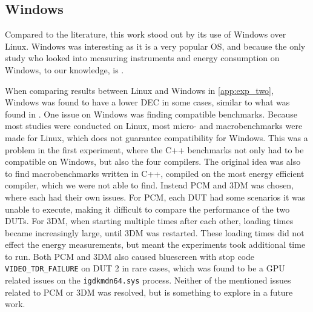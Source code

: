 \subsection{Windows}\label{subsec:windows_discussion}

Compared to the literature, this work stood out by its use of Windows over Linux\cite{khan2018rapl, georgiou2020energy, pereira2017}. Windows was interesting as it is a very popular OS, and because the only study who looked into measuring instruments and energy consumption on Windows, to our knowledge, is \cite{biksbois}.

When comparing results between Linux and Windows in \cref{app:exp_two}, Windows was found to have a lower DEC in some cases, similar to what was found in \cite{biksbois}. One issue on Windows was finding compatible benchmarks. Because most studies were conducted on Linux, most micro- and macrobenchmarks were made for Linux, which does not guarantee compatibility for Windows. This was a problem in the first experiment, where the C++ benchmarks not only had to be compatible on Windows, but also the four compilers. The original idea was also to find macrobenchmarks written in C++, compiled on the most energy efficient compiler, which we were not able to find. Instead PCM and 3DM was chosen, where each had their own issues. For PCM, each DUT had some scenarios it was unable to execute, making it difficult to compare the performance of the two DUTs. For 3DM, when starting multiple times after each other, loading times became increasingly large, until 3DM was restarted. These loading times did not effect the energy measurements, but meant the experiments took additional time to run. Both PCM and 3DM also caused bluescreen with stop code \texttt{VIDEO\_TDR\_FAILURE} on DUT 2 in rare cases, which was found to be a GPU related issues on the \texttt{igdkmdn64.sys} process. Neither of the mentioned issues related to PCM or 3DM was resolved, but is something to explore in a future work.



